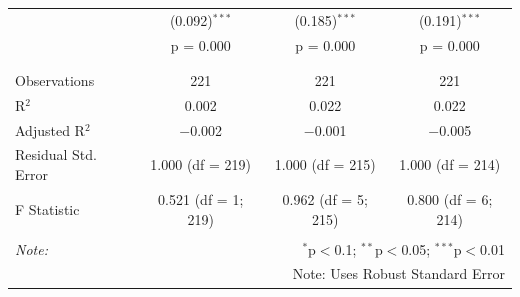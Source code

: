 \documentclass[
]{article}
\begin{document}
\begin{table}[!htbp]
\begin{tabular}{@{\extracolsep{3pt}}lccc}
  & (0.092)$^{***}$ & (0.185)$^{***}$ & (0.191)$^{***}$ \\ 
  & p = 0.000 & p = 0.000 & p = 0.000 \\ 
  & & & \\ 
\hline \\[-1.8ex] 
Observations & 221 & 221 & 221 \\ 
R$^{2}$ & 0.002 & 0.022 & 0.022 \\ 
Adjusted R$^{2}$ & $-$0.002 & $-$0.001 & $-$0.005 \\ 
Residual Std. Error & 1.000 (df = 219) & 1.000 (df = 215) & 1.000 (df = 214) \\ 
F Statistic & 0.521 (df = 1; 219) & 0.962 (df = 5; 215) & 0.800 (df = 6; 214) \\ 
\hline 
\hline \\[-1.8ex] 
\textit{Note:}  & \multicolumn{3}{r}{$^{*}$p$<$0.1; $^{**}$p$<$0.05; $^{***}$p$<$0.01} \\ 
 & \multicolumn{3}{r}{Note: Uses Robust Standard Error} \\ 
\end{tabular} 
\end{table} 
\clearpage

\clearpage
\end{document}
